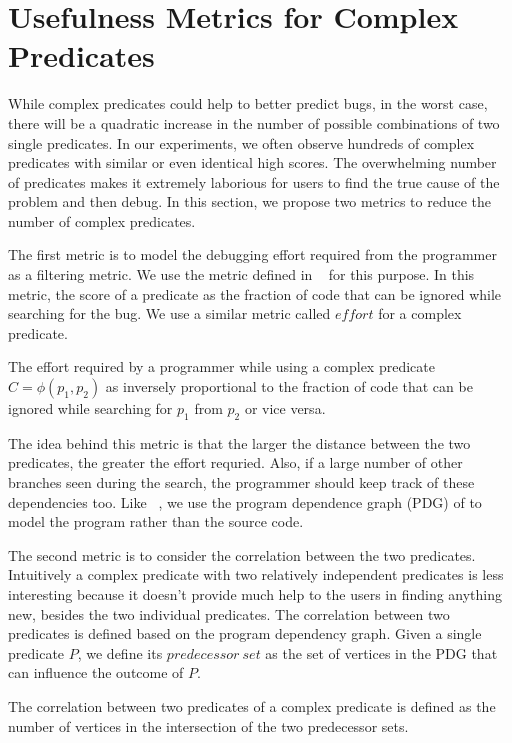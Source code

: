 \section{Usefulness Metrics for Complex Predicates}
\label{sec-metrics}
While complex predicates could help to better predict bugs, in the
worst case, there will be a quadratic increase in the number of
possible combinations of two single predicates. In our
experiments, we often observe hundreds of complex predicates with
similar or even identical high scores. The overwhelming number of
predicates makes it extremely laborious for users to find the true
cause of the problem and then debug. In this section, we propose two metrics
to reduce the number of complex predicates.

The first metric is to model the debugging effort required 
from the programmer as a filtering metric.  We use the metric defined
in ~\cite{1062522} for this purpose.  In this metric, the score of a predicate
as the fraction of code that can be ignored while searching for the bug.
We use a similar metric called $effort$ for a complex predicate.

\begin{defn}
\label{dfn4}
The effort required by a programmer while using a complex predicate 
$C = \phi(p_1, p_2)$ as inversely proportional to the fraction 
of code that can be ignored while searching for $p_1$ from $p_2$ or
vice versa.
\end{defn}

The idea behind this metric is that the larger the distance between
the two predicates, the greater the effort requried.  Also, if a 
large number of other branches seen during the search, the programmer
should keep track of these dependencies too.  Like ~\cite{1062522}, 
we use the program dependence graph (PDG) of to model the program rather
than the source code.

The second metric is to consider the correlation between the two predicates.  Intuitively a complex predicate with two relatively independent predicates is less interesting because it doesn't provide much help to the users in finding anything new, besides the two individual predicates.  The correlation between two predicates is defined based on the program dependency graph.  Given a single predicate $P$, we define its $predecessor\ set$ as the set of vertices in the PDG that can influence the outcome of $P$.

\begin{defn}
\label{dfn5}
The correlation between two predicates of a complex predicate is defined as the number of vertices in the intersection of the two predecessor sets.
\end{defn}

